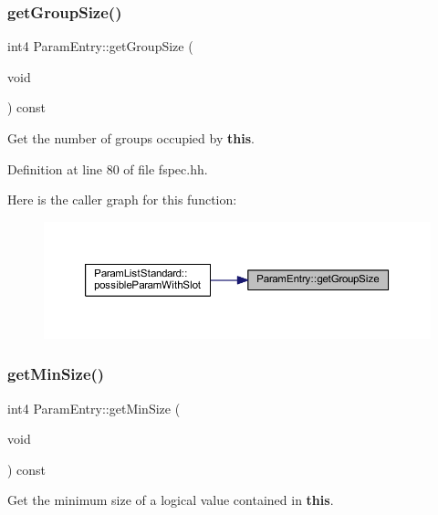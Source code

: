 \subsubsection{\texorpdfstring{getGroupSize()}{getGroupSize()}}
{\footnotesize\ttfamily int4 Param\+Entry\+::get\+Group\+Size (\begin{DoxyParamCaption}\item[{void}]{ }\end{DoxyParamCaption}) const\hspace{0.3cm}{\ttfamily [inline]}}



Get the number of groups occupied by {\bfseries{this}}. 



Definition at line 80 of file fspec.\+hh.

Here is the caller graph for this function\+:
\nopagebreak
\begin{figure}[H]
\begin{center}
\leavevmode
\includegraphics[width=350pt]{class_param_entry_aa260212ed69b0efb8fc52aba0930ab11_icgraph}
\end{center}
\end{figure}
\mbox{\label{class_param_entry_a6cf83bdd06247d2ca0f6b5c663f94ecb}} 
\subsubsection{\texorpdfstring{getMinSize()}{getMinSize()}}
{\footnotesize\ttfamily int4 Param\+Entry\+::get\+Min\+Size (\begin{DoxyParamCaption}\item[{void}]{ }\end{DoxyParamCaption}) const\hspace{0.3cm}{\ttfamily [inline]}}



Get the minimum size of a logical value contained in {\bfseries{this}}. 



